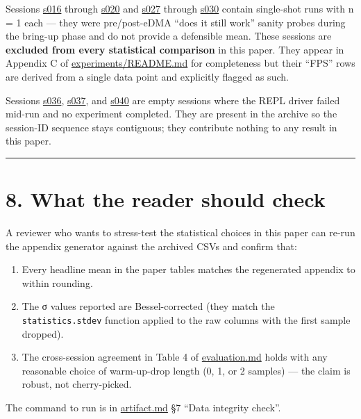 Sessions \href{../experiments/s016_e15_512/}{s016} through
\href{../experiments/s020_e15_512/}{s020} and
\href{../experiments/s027_e15_512/}{s027} through
\href{../experiments/s030_e15_512/}{s030} contain single-shot runs with
n = 1 each --- they were pre/post-eDMA ``does it still work'' sanity
probes during the bring-up phase and do not provide a defensible mean.
These sessions are \textbf{excluded from every statistical comparison}
in this paper. They appear in Appendix C of
\href{../experiments/README.md}{experiments/README.md} for completeness
but their ``FPS'' rows are derived from a single data point and
explicitly flagged as such.

Sessions \href{../experiments/s036_e17_drain_ab/}{s036},
\href{../experiments/s037_e17_drain_ab/}{s037}, and
\href{../experiments/s040_e17_drain_ab/}{s040} are empty sessions where
the REPL driver failed mid-run and no experiment completed. They are
present in the archive so the session-ID sequence stays contiguous; they
contribute nothing to any result in this paper.

\begin{center}\rule{0.5\linewidth}{0.5pt}\end{center}

\section{8. What the reader should
check}\label{what-the-reader-should-check}

A reviewer who wants to stress-test the statistical choices in this
paper can re-run the appendix generator against the archived CSVs and
confirm that:

\begin{enumerate}
\def\labelenumi{\arabic{enumi}.}
\tightlist
\item
  Every headline mean in the paper tables matches the regenerated
  appendix to within rounding.
\item
  The σ values reported are Bessel-corrected (they match the
  \texttt{statistics.stdev} function applied to the raw columns with the
  first sample dropped).
\item
  The cross-session agreement in Table 4 of \url{evaluation.md} holds
  with any reasonable choice of warm-up-drop length (0, 1, or 2 samples)
  --- the claim is robust, not cherry-picked.
\end{enumerate}

The command to run is in \url{artifact.md} §7 ``Data integrity check''.
